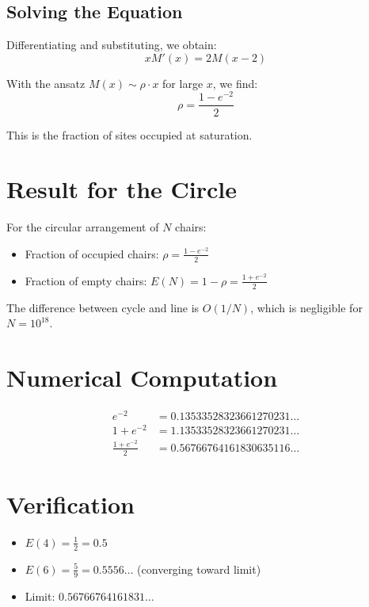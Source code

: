\documentclass[11pt]{article}
\begin{document}
\subsection{Solving the Equation}

Differentiating and substituting, we obtain:
\[
x M'(x) = 2M(x-2)
\]

With the ansatz $M(x) \sim \rho \cdot x$ for large $x$, we find:
\[
\rho = \frac{1 - e^{-2}}{2}
\]

This is the fraction of sites occupied at saturation.

\section{Result for the Circle}

For the circular arrangement of $N$ chairs:
\begin{itemize}
\item Fraction of occupied chairs: $\rho = \frac{1 - e^{-2}}{2}$
\item Fraction of empty chairs: $E(N) = 1 - \rho = \frac{1 + e^{-2}}{2}$
\end{itemize}

The difference between cycle and line is $O(1/N)$, which is negligible for $N = 10^{18}$.

\section{Numerical Computation}

\begin{align*}
e^{-2} &= 0.13533528323661270231\ldots \\
1 + e^{-2} &= 1.13533528323661270231\ldots \\
\frac{1 + e^{-2}}{2} &= 0.56766764161830635116\ldots
\end{align*}

\section{Verification}

\begin{itemize}
\item $E(4) = \frac{1}{2} = 0.5$ \checkmark
\item $E(6) = \frac{5}{9} = 0.5556\ldots$ (converging toward limit)
\item Limit: $0.56766764161831\ldots$
\end{itemize}
\end{document}
